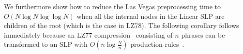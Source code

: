 	
	

\noindent We furthermore show how to reduce the Las Vegas preprocessing time to $O(N\log N\log\log N)$ when all the internal nodes in the Linear SLP are children of the root (which is the case in LZ78).
The following corollary follows immediately because an LZ77 compression~\cite{lz1977} consisting of $n$ phrases can be transformed to an SLP with $O(n\log\frac{N}{n})$ production rules~\cite{charikar2005smallest,rytter2003application}.

